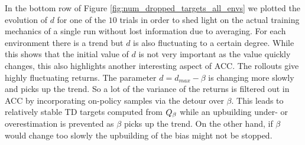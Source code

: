 In the bottom row of Figure \ref{fig:num_dropped_targets_all_envs} we plotted the evolution of $d$ for one of the $10$ trials in order to shed light on the actual training mechanics of a single run without lost information due to averaging.
For each environment there is a trend but $d$ is also fluctuating to a certain degree.
While this shows that the initial value of $d$ is not very important as the value quickly changes, this also highlights another interesting aspect of ACC. 
The rollouts give highly fluctuating returns. The parameter $d=d_{max}-\beta$ is changing more slowly and picks up the trend. So a lot of the variance of the returns is filtered out in ACC by incorporating on-policy samples via the detour over $\beta$.
This leads to relatively stable TD targets computed from $Q_{\beta}$ while an upbuilding under- or overestimation is prevented as $\beta$ picks up the trend. On the other hand, if $\beta$ would change too slowly the upbuilding of the bias might not be stopped.





